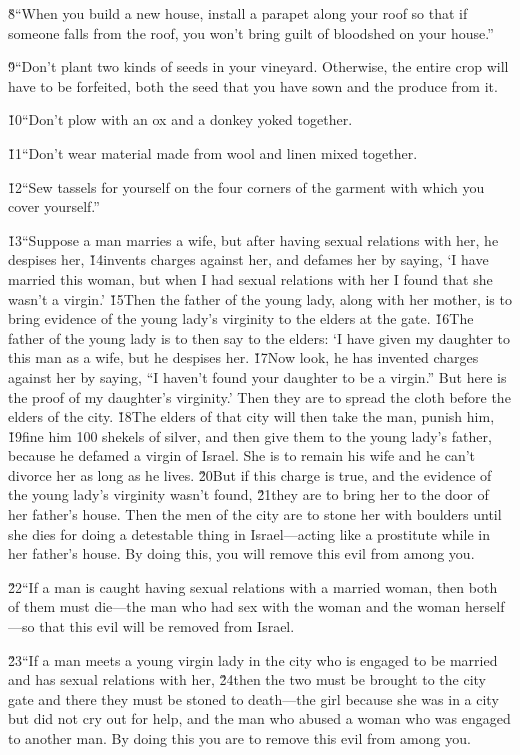 \v{8}``When you build a new house, install a parapet along your roof so that if someone falls from the roof, you won't bring guilt of bloodshed on your house.''

\v{9}``Don't plant two kinds of seeds in your vineyard. Otherwise, the entire crop will have to be forfeited, both the seed that you have sown and the produce from it.

\v{10}``Don't plow with an ox and a donkey yoked together.

\v{11}``Don't wear material made from wool and linen mixed together.

\v{12}``Sew tassels for yourself on the four corners of the garment with which you cover yourself.''

\v{13}``Suppose a man marries a wife, but after having sexual relations with her, he despises her, \v{14}invents charges against her, and defames her by saying, `I have married this woman, but when I had sexual relations with her I found that she wasn't a virgin.' \v{15}Then the father of the young lady, along with her mother, is to bring evidence of the young lady's virginity to the elders at the gate. \v{16}The father of the young lady is to then say to the elders: `I have given my daughter to this man as a wife, but he despises her. \v{17}Now look, he has invented charges against her by saying, ``I haven't found your daughter to be a virgin.'' But here is the proof of my daughter's virginity.' Then they are to spread the cloth before the elders of the city. \v{18}The elders of that city will then take the man, punish him, \v{19}fine him 100 shekels of silver, and then give them to the young lady's father, because he defamed a virgin of Israel. She is to remain his wife and he can't divorce her as long as he lives. \v{20}But if this charge is true, and the evidence of the young lady's virginity wasn't found, \v{21}they are to bring her to the door of her father's house. Then the men of the city are to stone her with boulders until she dies for doing a detestable thing in Israel---acting like a prostitute while in her father's house. By doing this, you will remove this evil from among you.

\v{22}``If a man is caught having sexual relations with a married woman, then both of them must die---the man who had sex with the woman and the woman herself---so that this evil will be removed from Israel.

\v{23}``If a man meets a young virgin lady in the city who is engaged to be married and has sexual relations with her, \v{24}then the two must be brought to the city gate and there they must be stoned to death---the girl because she was in a city but did not cry out for help, and the man who abused a woman who was engaged to another man. By doing this you are to remove this evil from among you.


